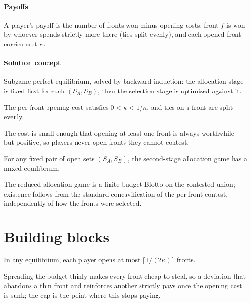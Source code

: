 \documentclass[10pt,a4paper]{article}
\begin{document}
\paragraph{Payoffs} \noindent A player's payoff is the number of fronts won
minus opening costs: front $f$ is won by whoever spends strictly more there
(ties split evenly), and each opened front carries cost $\kappa$.

\paragraph{Solution concept} \noindent Subgame-perfect equilibrium, solved by
backward induction: the allocation stage is fixed first for each $(S_A,S_B)$,
then the selection stage is optimised against it.

\begin{assumption}[v]\label{ass:cost}
The per-front opening cost satisfies $0<\kappa<1/n$, and ties on a front are
split evenly.
\end{assumption}

\noindent\Intuition The cost is small enough that opening at least one front is
always worthwhile, but positive, so players never open fronts they cannot
contest.

\begin{proposition}[p]\label{prop:exist}
For any fixed pair of open sets $(S_A,S_B)$, the second-stage allocation game
has a mixed equilibrium.
\end{proposition}

\noindent\Intuition The reduced allocation game is a finite-budget Blotto on the
contested union; existence follows from the standard concavification of the
per-front contest, independently of how the fronts were selected.

\section{Building blocks}\label{sec:blocks}

\begin{lemma}[p]\label{lem:concentrate}
In any equilibrium, each player opens at most $\lceil 1/(2\kappa)\rceil$ fronts.
\end{lemma}

\Intuition Spreading the budget thinly makes every front cheap to steal, so a
deviation that abandons a thin front and reinforces another strictly pays once
the opening cost is sunk; the cap is the point where this stops paying.
\end{document}
